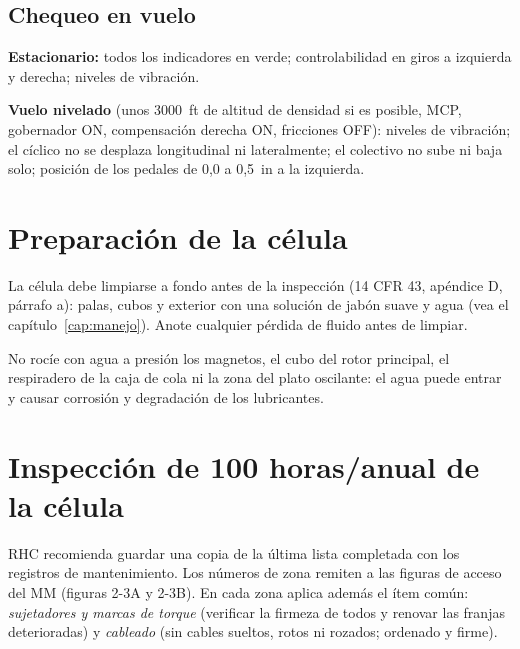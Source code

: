 \subsection{Chequeo en vuelo}

\begin{pasos}
\item \textbf{Estacionario:} todos los indicadores en verde; controlabilidad en giros a izquierda y derecha; niveles de vibración.
\item \textbf{Vuelo nivelado} (unos 3000~ft de altitud de densidad si es posible, MCP, gobernador ON, compensación derecha ON, fricciones OFF): niveles de vibración; el cíclico no se desplaza longitudinal ni lateralmente; el colectivo no sube ni baja solo; posición de los pedales de 0,0 a 0,5~in a la izquierda.
\end{pasos}

\section{Preparación de la célula}

La célula debe limpiarse a fondo antes de la inspección (14 CFR 43, apéndice D, párrafo a): palas, cubos y exterior con una solución de jabón suave y agua (vea el capítulo~\ref{cap:manejo}). Anote cualquier pérdida de fluido antes de limpiar.

\begin{precaucion}
No rocíe con agua a presión los magnetos, el cubo del rotor principal, el respiradero de la caja de cola ni la zona del plato oscilante: el agua puede entrar y causar corrosión y degradación de los lubricantes.
\end{precaucion}

\section{Inspección de 100 horas/anual de la célula}

RHC recomienda guardar una copia de la última lista completada con los registros de mantenimiento. Los números de zona remiten a las figuras de acceso del MM (figuras 2-3A y 2-3B). En cada zona aplica además el ítem común: \emph{sujetadores y marcas de torque} (verificar la firmeza de todos y renovar las franjas deterioradas) y \emph{cableado} (sin cables sueltos, rotos ni rozados; ordenado y firme).


